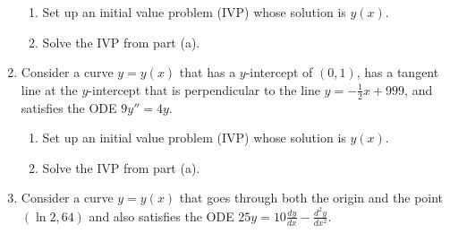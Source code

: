 \documentclass[12pt]{article}
\newif\ifans
\begin{document}
\begin{enumerate}
\begin{enumerate}

\item Set up an initial value problem (IVP) whose solution is $y(x)$.

\ifans{\fbox{$\left\{\begin{array}{l}
y''+2y'+3y=0
\\ \\
y\left(\frac{\pi}{\sqrt{2}}\right)=e^{-\pi/\sqrt{2}}
\\ \\
y'\left(\frac{\pi}{\sqrt{2}}\right)=0
\end{array}\right.$}} \fi

\item Solve the IVP from part (a).

\ifans{\fbox{$y=-e^{-x}\cos\left(\sqrt{2}x\right)-\frac{1}{\sqrt{2}}e^{-x}\sin\left(\sqrt{2}x\right)$}} \fi

\end{enumerate}

\item Consider a curve $y=y(x)$ that has a $y$-intercept of $(0,1)$, has a tangent line at the $y$-intercept that is perpendicular to the line $y=-\frac{1}{2}x+999$, and satisfies the ODE 
$9y''=4y$.

\begin{enumerate}

\item Set up an initial value problem (IVP) whose solution is $y(x)$.

\ifans{\fbox{$\left\{\begin{array}{l}
9y''=4y
\\ \\
y(0)=1
\\ \\
y'(0)=2
\end{array}\right.$}} \fi

\item Solve the IVP from part (a).

\ifans{\fbox{$y=2e^{2x/3}-e^{-2x/3}$}} \fi

\end{enumerate}

\item Consider a curve $y=y(x)$ that goes through both the origin and the point $\left(\ln{2},64\right)$ and also satisfies the ODE $25y=10\frac{dy}{dx}-\frac{d^2y}{dx^2}$.

\begin{enumerate}


\end{enumerate}
\end{enumerate}
\end{document}
